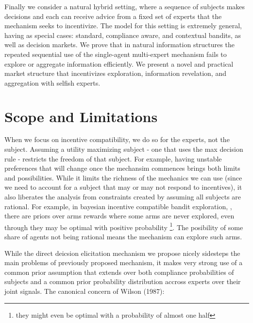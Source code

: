 Finally we consider a natural hybrid setting, where a sequence of subjects makes decisions and each can receive advice from a fixed set of experts that the mechanism seeks to incentivize.
The model for this setting is extremely general, having as special cases: standard, compliance aware, and contextual bandits, as well as decision markets.
We prove that in natural information structures the repeated sequential use of the single-agent multi-expert mechanism fails to explore or aggregate information efficiently.
We present a novel and practical market structure that incentivizes exploration, information revelation, and aggregation with selfish experts.


\section{Scope and Limitations}

When we focus on incentive compatibility, we do so for the experts, not the subject. Assuming a utility maximizing subject - one that uses the max decision rule - restricts the freedom of that subject. For example, having unstable preferences that will change once the mechansim commences brings both limits and possibilities. While it limits the richness of the mechanics we can use (since we need to account for a subject that may or may not respond to incentives), it also liberates the analysis from constraints created by assuming all subjects are rational. For example, in bayesian incentive compatible bandit exploration, \cite{mansour2015bayesian}, there are priors over arms rewards where some arms are never explored, even through they may be optimal with positive probability \footnote{they might even be optimal with a probability of almost one half}. The posibility of some share of agents not being rational means the mechanism can explore such arms.

While the direct deicsion elicitation mechanism we propose nicely sidesteps the main problems of previously proposed mechanism, it makes very strong use of a common prior assumption that extends over both compliance probabilities of subjects and a common prior probability distribution accross experts over their joint signals. The canonical concern of Wilson (1987):



